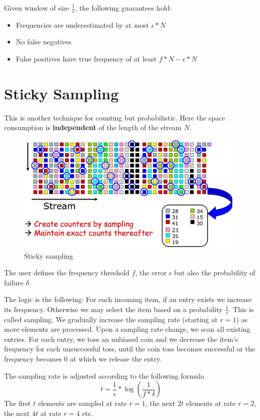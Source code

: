 \documentclass[a4paper, 12pt]{book} %
\begin{document}
Given window of size $\frac{1}{\epsilon}$, the following guarantees hold:
\begin{itemize}
	\item Frequencies are underestimated by at most $\epsilon * N$
	\item No false negatives
	\item False positives have true frequency of at least $f*N - \epsilon*N$
\end{itemize}

\section{Sticky Sampling}
This is another technique for counting but probabilistic. Here the space consumption is \textbf{independent} of the length of the stream $N$.
\begin{figure}[htpb]
	\centering
	\includegraphics[width=11cm]{figures/step1_sticky_sampling.png}
	\caption{Sticky sampling}
	\label{fig:boat1}
\end{figure}

The user defines the frequency threshold $f$, the error $\epsilon$ but also the probability of failure $\delta$.

The logic is the following: For each incoming item, if an entry exists we increase its frequency. Otherwise we may select the item based on a probability $\frac{1}{r}$. This is called sampling. We gradually increase the sampling rate (starting at $r=1$) as more elements are processed. Upon a sampling rate change, we scan all existing entries. For each entry, we toss an unbiased coin and we decrease the item's frequency for each unsuccessful toss, until the coin toss becomes successful or the frequency becomes $0$ at which we release the entry.

The sampling rate is adjusted according to the following formula
$$t = \frac{1}{\epsilon} * \log{(\frac{1}{f*\delta})}$$
The first $t$ elements are sampled at rate $r=1$, the next $2t$ elements at rate $r=2$, the next $4t$ at rate $r=4$ etc.
\end{document}
